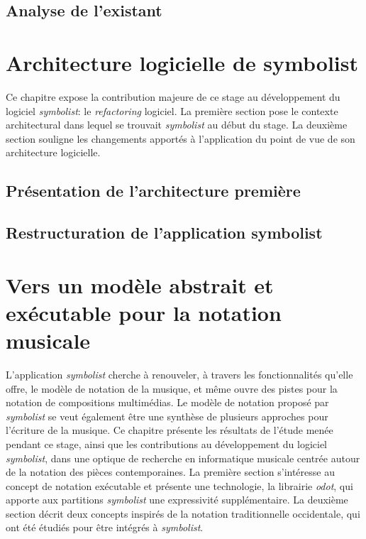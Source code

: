 \documentclass[utf8,final]{stageM2R} %
\begin{document}
	\section{Analyse de l'existant}
	\label{sec:analyseSymbolist}
	
	
\chapter{Architecture logicielle de symbolist}
\label{chap:architectureSymbolist}
Ce chapitre expose la contribution majeure de ce stage au développement du logiciel \textit{symbolist}: le \textit{refactoring} logiciel. La première section pose le contexte architectural dans lequel se trouvait \textit{symbolist} au début du stage. La deuxième section souligne les changements  apportés à l'application du point de vue de son architecture logicielle.

	\section{Présentation de l'architecture première}
	\label{sec:architecturePremiere}
	

	\section{Restructuration de l'application symbolist}
	\label{sec:restructurationSymbolist}
	

\chapter{Vers un modèle abstrait et exécutable pour la notation musicale}
\label{chap:modeleDeNotation}
L'application \textit{symbolist} cherche à renouveler, à travers les fonctionnalités qu'elle offre, le modèle de notation de la musique, et même ouvre des pistes pour la notation de compositions multimédias. Le modèle de notation proposé par \textit{symbolist} se veut également être une synthèse de plusieurs approches pour l'écriture de la musique.
Ce chapitre présente les résultats de l'étude menée pendant ce stage, ainsi que les contributions au développement du logiciel \textit{symbolist}, dans une optique de recherche en informatique musicale centrée autour de la notation des pièces contemporaines.
La première section s'intéresse au concept de notation exécutable et présente une technologie, la librairie \textit{odot}, qui apporte aux partitions \textit{symbolist} une expressivité supplémentaire. La deuxième section décrit deux concepts inspirés de la notation traditionnelle occidentale, qui ont été étudiés pour être intégrés à \textit{symbolist}.
\end{document}
